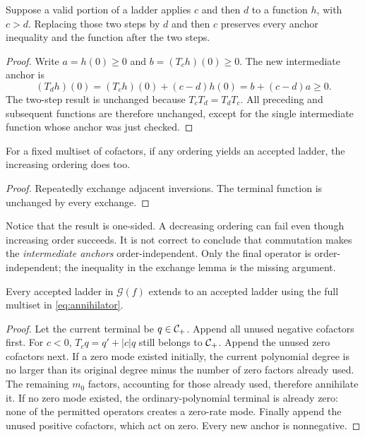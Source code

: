 \begin{lemma}
\label{lem:exchange}
Suppose a valid portion of a ladder applies $c$ and then $d$ to a function $h$, with $c>d$. Replacing those two steps by $d$ and then $c$ preserves every anchor inequality and the function after the two steps.
\end{lemma}
\begin{proof}
Write $a=h(0)\ge0$ and $b=(T_ch)(0)\ge0$. The new intermediate anchor is
\[
 (T_dh)(0)=(T_ch)(0)+(c-d)h(0)=b+(c-d)a\ge0.
\]
The two-step result is unchanged because $T_cT_d=T_dT_c$. All preceding and subsequent functions are therefore unchanged, except for the single intermediate function whose anchor was just checked.
\end{proof}

\begin{corollary}
\label{cor:sorted}
For a fixed multiset of cofactors, if any ordering yields an accepted ladder, the increasing ordering does too.
\end{corollary}
\begin{proof}
Repeatedly exchange adjacent inversions. The terminal function is unchanged by every exchange.
\end{proof}

Notice that the result is one-sided. A decreasing ordering can fail even though increasing order succeeds. It is not correct to conclude that commutation makes the \emph{intermediate anchors} order-independent. Only the final operator is order-independent; the inequality in the exchange lemma is the missing argument.

\begin{lemma}
\label{lem:complete}
Every accepted ladder in $\mathcal G(f)$ extends to an accepted ladder using the full multiset in \eqref{eq:annihilator}.
\end{lemma}
\begin{proof}
Let the current terminal be $q\in\mathcal C_+$. Append all unused negative cofactors first. For $c<0$, $T_cq=q'+|c|q$ still belongs to $\mathcal C_+$. Append the unused zero cofactors next. If a zero mode existed initially, the current polynomial degree is no larger than its original degree minus the number of zero factors already used. The remaining $m_0$ factors, accounting for those already used, therefore annihilate it. If no zero mode existed, the ordinary-polynomial terminal is already zero: none of the permitted operators creates a zero-rate mode. Finally append the unused positive cofactors, which act on zero. Every new anchor is nonnegative.
\end{proof}

